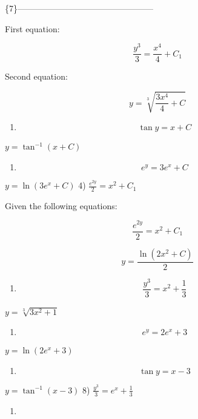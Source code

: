 \documentclass[
]{article}
\providecommand{\tightlist}{%
  \setlength{\itemsep}{0pt}\setlength{\parskip}{0pt}}
\begin{document}
\{7\}------------------------------------------------

First equation:

\[\frac{y^3}{3} = \frac{x^4}{4} + C_1\]

Second equation:

\[y = \sqrt[3]{\frac{3x^4}{4} + C}\]

\begin{enumerate}
\def\labelenumi{\arabic{enumi})}
\setcounter{enumi}{1}
\tightlist
\item
  \[\tan y = x + C\]
\end{enumerate}

\(y = \tan^{-1} (x + C)\)

\begin{enumerate}
\def\labelenumi{\arabic{enumi})}
\setcounter{enumi}{2}
\tightlist
\item
  \[e^y = 3e^x + C\]
\end{enumerate}

\(y = \ln (3e^x + C)\) 4) \(\frac{e^{2y}}{2} = x^2 + C_1\)

Given the following equations:

\[\frac{e^{2y}}{2} = x^2 + C_1\]

\[y = \frac{\ln(2x^2 + C)}{2}\]

\begin{enumerate}
\def\labelenumi{\arabic{enumi})}
\setcounter{enumi}{4}
\tightlist
\item
  \[\frac{y^3}{3} = x^2 + \frac{1}{3}\]
\end{enumerate}

\(y = \sqrt[3]{3x^2 + 1}\)

\begin{enumerate}
\def\labelenumi{\arabic{enumi})}
\setcounter{enumi}{5}
\tightlist
\item
  \[e^y = 2e^x + 3\]
\end{enumerate}

\(y = \ln (2e^x + 3)\)

\begin{enumerate}
\def\labelenumi{\arabic{enumi})}
\setcounter{enumi}{6}
\tightlist
\item
  \[\tan y = x - 3\]
\end{enumerate}

\(y = \tan^{-1}(x - 3)\) 8) \(\frac{y^3}{3} = e^x + \frac{1}{3}\)

\begin{enumerate}
\def\labelenumi{\arabic{enumi})}
\setcounter{enumi}{7}
\tightlist
\item
\end{enumerate}
\end{document}
